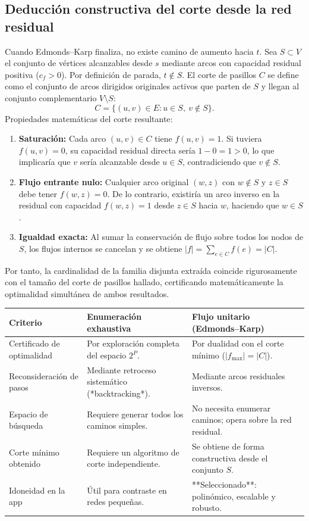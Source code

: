 \documentclass[11pt,a4paper]{article}
\newcommand{\tema}[1]{\subsection*{\color{verde}#1}}
\begin{document}
\tema{Deducción constructiva del corte desde la red residual}
Cuando Edmonds–Karp finaliza, no existe camino de aumento hacia $t$. Sea $S \subset V$ el conjunto de vértices alcanzables desde $s$ mediante arcos con capacidad residual positiva ($c_f > 0$). Por definición de parada, $t \notin S$. El corte de pasillos $C$ se define como el conjunto de arcos dirigidos originales activos que parten de $S$ y llegan al conjunto complementario $V \setminus S$:
\[
  C = \{ (u, v) \in E : u \in S, \ v \notin S \}.
\]
Propiedades matemáticas del corte resultante:
\begin{enumerate}
  \item \textbf{Saturación:} Cada arco $(u, v) \in C$ tiene $f(u, v) = 1$. Si tuviera $f(u, v) = 0$, su capacidad residual directa sería $1 - 0 = 1 > 0$, lo que implicaría que $v$ sería alcanzable desde $u \in S$, contradiciendo que $v \notin S$.
  \item \textbf{Flujo entrante nulo:} Cualquier arco original $(w, z)$ con $w \notin S$ y $z \in S$ debe tener $f(w, z) = 0$. De lo contrario, existiría un arco inverso en la residual con capacidad $f(w, z) = 1$ desde $z \in S$ hacia $w$, haciendo que $w \in S$.
  \item \textbf{Igualdad exacta:} Al sumar la conservación de flujo sobre todos los nodos de $S$, los flujos internos se cancelan y se obtiene $|f| = \sum_{e \in C} f(e) = |C|$.
\end{enumerate}
Por tanto, la cardinalidad de la familia disjunta extraída coincide rigurosamente con el tamaño del corte de pasillos hallado, certificando matemáticamente la optimalidad simultánea de ambos resultados.

\begin{center}
{\small
\begin{tabularx}{\linewidth}{@{}p{.22\linewidth}XX@{}}
\toprule
\textbf{Criterio} & \textbf{Enumeración exhaustiva} & \textbf{Flujo unitario (Edmonds--Karp)} \\
\midrule
Certificado de optimalidad & Por exploración completa del espacio $2^P$. & Por dualidad con el corte mínimo ($|f_{\max}| = |C|$). \\
Reconsideración de pasos & Mediante retroceso sistemático (*backtracking*). & Mediante arcos residuales inversos. \\
Espacio de búsqueda & Requiere generar todos los caminos simples. & No necesita enumerar caminos; opera sobre la red residual. \\
Corte mínimo obtenido & Requiere un algoritmo de corte independiente. & Se obtiene de forma constructiva desde el conjunto $S$. \\
Idoneidad en la app & Útil para contraste en redes pequeñas. & **Seleccionado**: polinómico, escalable y robusto. \\
\bottomrule
\end{tabularx}}
\end{center}
\end{document}
